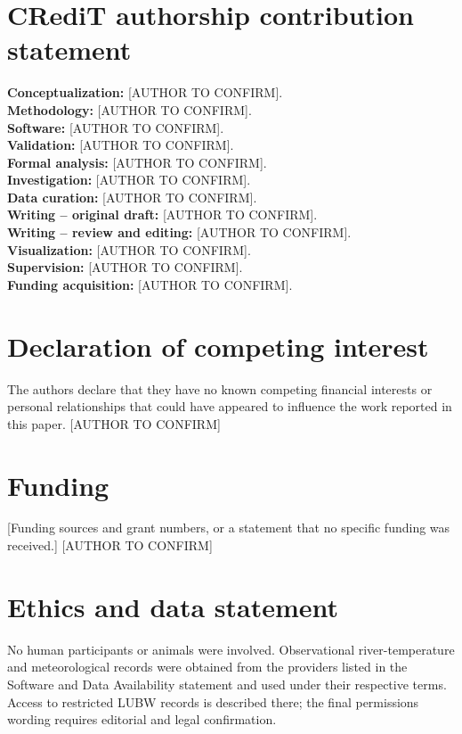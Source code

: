 \section*{CRediT authorship contribution statement}

\noindent\textbf{Conceptualization:} [AUTHOR TO CONFIRM].\\
\textbf{Methodology:} [AUTHOR TO CONFIRM].\\
\textbf{Software:} [AUTHOR TO CONFIRM].\\
\textbf{Validation:} [AUTHOR TO CONFIRM].\\
\textbf{Formal analysis:} [AUTHOR TO CONFIRM].\\
\textbf{Investigation:} [AUTHOR TO CONFIRM].\\
\textbf{Data curation:} [AUTHOR TO CONFIRM].\\
\textbf{Writing -- original draft:} [AUTHOR TO CONFIRM].\\
\textbf{Writing -- review and editing:} [AUTHOR TO CONFIRM].\\
\textbf{Visualization:} [AUTHOR TO CONFIRM].\\
\textbf{Supervision:} [AUTHOR TO CONFIRM].\\
\textbf{Funding acquisition:} [AUTHOR TO CONFIRM].

\section*{Declaration of competing interest}

The authors declare that they have no known competing financial interests or personal relationships that could have appeared to influence the work reported in this paper. [AUTHOR TO CONFIRM]

\section*{Funding}

[Funding sources and grant numbers, or a statement that no specific funding was received.] [AUTHOR TO CONFIRM]

\section*{Ethics and data statement}

No human participants or animals were involved. Observational river-temperature and meteorological records were obtained from the providers listed in the Software and Data Availability statement and used under their respective terms. Access to restricted LUBW records is described there; the final permissions wording requires editorial and legal confirmation.

